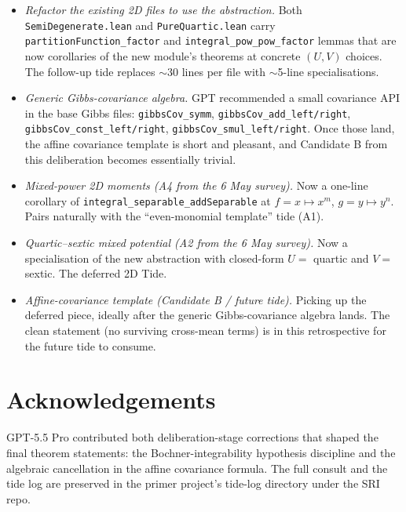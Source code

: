 \documentclass[11pt]{article}
\begin{document}
\begin{itemize}
\item \emph{Refactor the existing 2D files to use the abstraction.}
Both \texttt{SemiDegenerate.lean} and \texttt{PureQuartic.lean} carry
\texttt{partitionFunction\_factor} and \texttt{integral\_pow\_pow\_factor}
lemmas that are now corollaries of the new module's theorems at
concrete $(U, V)$ choices. The follow-up tide replaces $\sim$30 lines
per file with $\sim$5-line specialisations.

\item \emph{Generic Gibbs-covariance algebra.} GPT recommended a small
covariance API in the base Gibbs files: \texttt{gibbsCov\_symm},
\texttt{gibbsCov\_add\_left/right}, \texttt{gibbsCov\_const\_left/right},
\texttt{gibbsCov\_smul\_left/right}. Once those land, the affine
covariance template is short and pleasant, and Candidate B from this
deliberation becomes essentially trivial.

\item \emph{Mixed-power 2D moments (A4 from the 6 May survey).} Now a
one-line corollary of \texttt{integral\_separable\_addSeparable} at
$f = x \mapsto x^m$, $g = y \mapsto y^n$. Pairs naturally with the
``even-monomial template'' tide (A1).

\item \emph{Quartic--sextic mixed potential (A2 from the 6 May survey).}
Now a specialisation of the new abstraction with closed-form
$U = $ quartic and $V = $ sextic. The deferred 2D Tide.

\item \emph{Affine-covariance template (Candidate B / future tide).}
Picking up the deferred piece, ideally after the generic Gibbs-covariance
algebra lands. The clean statement (no surviving cross-mean terms) is
in this retrospective for the future tide to consume.
\end{itemize}

\section*{Acknowledgements}

GPT-5.5 Pro contributed both deliberation-stage corrections that
shaped the final theorem statements: the Bochner-integrability
hypothesis discipline and the algebraic cancellation in the affine
covariance formula. The full consult and the tide log are preserved in
the primer project's tide-log directory under the SRI repo.
\end{document}
